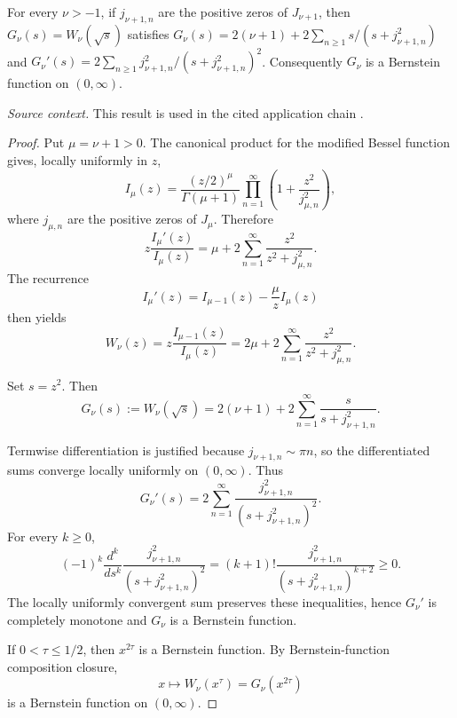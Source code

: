 \begin{theorem}
\label{res:yt-bessel-w-general-zero-partial-fraction}
For every \(\nu>-1\), if \(j_{\nu+1,n}\) are the positive zeros of \(J_{\nu+1}\), then \(G_\nu(s)=W_\nu(\sqrt{s})\) satisfies \(G_\nu(s)=2(\nu+1)+2\sum_{n\ge1}s/(s+j_{\nu+1,n}^2)\) and \(G_\nu'(s)=2\sum_{n\ge1}j_{\nu+1,n}^2/(s+j_{\nu+1,n}^2)^2\). Consequently \(G_\nu\) is a Bernstein function on \((0,\infty)\).

\emph{Source context.} This result is used in the cited application chain \cite{app-app-0040-source}.
\end{theorem}
\begin{proof}
Put \(\mu=\nu+1>0\). The canonical product for the modified Bessel function gives, locally uniformly in \(z\),
\[
I_\mu(z)=\frac{(z/2)^\mu}{\Gamma(\mu+1)}
\prod_{n=1}^{\infty}\left(1+\frac{z^2}{j_{\mu,n}^2}\right),
\]
where \(j_{\mu,n}\) are the positive zeros of \(J_\mu\). Therefore
\[
z\frac{I_\mu'(z)}{I_\mu(z)}
=\mu+2\sum_{n=1}^{\infty}\frac{z^2}{z^2+j_{\mu,n}^2}.
\]
The recurrence
\[
I_\mu'(z)=I_{\mu-1}(z)-\frac{\mu}{z}I_\mu(z)
\]
then yields
\[
W_\nu(z)
=z\frac{I_{\mu-1}(z)}{I_\mu(z)}
=2\mu+2\sum_{n=1}^{\infty}\frac{z^2}{z^2+j_{\mu,n}^2}.
\]

Set \(s=z^2\). Then
\[
G_\nu(s):=W_\nu(\sqrt s)
=2(\nu+1)+2\sum_{n=1}^{\infty}\frac{s}{s+j_{\nu+1,n}^2}.
\]

Termwise differentiation is justified because \(j_{\nu+1,n}\sim \pi n\), so the differentiated sums converge locally uniformly on \((0,\infty)\). Thus
\[
G_\nu'(s)
=2\sum_{n=1}^{\infty}
\frac{j_{\nu+1,n}^2}{(s+j_{\nu+1,n}^2)^2}.
\]
For every \(k\ge0\),
\[
(-1)^k\frac{d^k}{ds^k}
\frac{j_{\nu+1,n}^2}{(s+j_{\nu+1,n}^2)^2}
=
(k+1)!\frac{j_{\nu+1,n}^2}{(s+j_{\nu+1,n}^2)^{k+2}}
\ge0.
\]
The locally uniformly convergent sum preserves these inequalities, hence \(G_\nu'\) is completely monotone and \(G_\nu\) is a Bernstein function.

If \(0<\tau\le1/2\), then \(x^{2\tau}\) is a Bernstein function. By Bernstein-function composition closure,
\[
x\mapsto W_\nu(x^\tau)=G_\nu(x^{2\tau})
\]
is a Bernstein function on \((0,\infty)\).
\end{proof}

